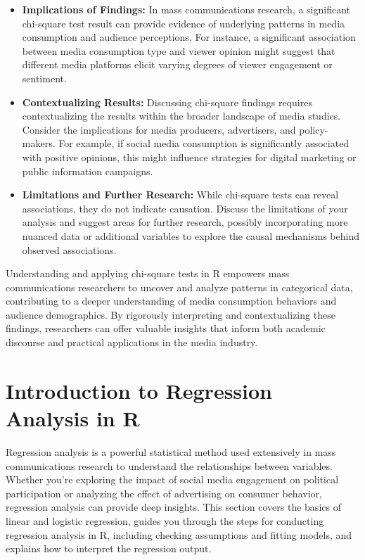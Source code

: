 \documentclass[
]{book}
\begin{document}
\begin{itemize}
\item
  \textbf{Implications of Findings:} In mass communications research, a significant chi-square test result can provide evidence of underlying patterns in media consumption and audience perceptions. For instance, a significant association between media consumption type and viewer opinion might suggest that different media platforms elicit varying degrees of viewer engagement or sentiment.
\item
  \textbf{Contextualizing Results:} Discussing chi-square findings requires contextualizing the results within the broader landscape of media studies. Consider the implications for media producers, advertisers, and policy-makers. For example, if social media consumption is significantly associated with positive opinions, this might influence strategies for digital marketing or public information campaigns.
\item
  \textbf{Limitations and Further Research:} While chi-square tests can reveal associations, they do not indicate causation. Discuss the limitations of your analysis and suggest areas for further research, possibly incorporating more nuanced data or additional variables to explore the causal mechanisms behind observed associations.
\end{itemize}

Understanding and applying chi-square tests in R empowers mass communications researchers to uncover and analyze patterns in categorical data, contributing to a deeper understanding of media consumption behaviors and audience demographics. By rigorously interpreting and contextualizing these findings, researchers can offer valuable insights that inform both academic discourse and practical applications in the media industry.

\hypertarget{introduction-to-regression-analysis-in-r}{%
\section{Introduction to Regression Analysis in R}\label{introduction-to-regression-analysis-in-r}}

Regression analysis is a powerful statistical method used extensively in mass communications research to understand the relationships between variables. Whether you're exploring the impact of social media engagement on political participation or analyzing the effect of advertising on consumer behavior, regression analysis can provide deep insights. This section covers the basics of linear and logistic regression, guides you through the steps for conducting regression analysis in R, including checking assumptions and fitting models, and explains how to interpret the regression output.
\end{document}
